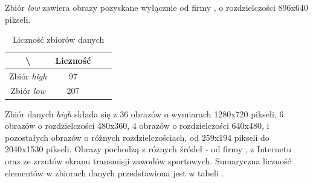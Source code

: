 Zbiór \textit{low} zawiera obrazy pozyskane wyłącznie od firmy \blue{}, o rozdzielczości 896x640 pikseli.

\begin{table}[!h]
	\centering
	\caption{Liczność zbiorów danych}
	\vspace{6pt}
	{\footnotesize
		\begin{tabular}{|c|c|c|c|}
			\hline \textbackslash & Liczność \\
      \hline Zbiór \textit{high} & 97 \\
      \hline Zbiór \textit{low} & 207 \\
      \hline
    \end{tabular}
    \label{Tab:licznosc}
	}
	\vspace{0pt}
\end{table}

Zbiór danych \textit{high} składa się z 36 obrazów o wymiarach 1280x720 pikseli, 6 obrazów o rozdzielczości 480x360, 4 obrazów o rozdzielczości 640x480, i pozostałych obrazów o różnych rozdzielczościach, od 259x194 pikseli do 2040x1530 pikseli. Obrazy pochodzą z różnych źródeł - od firmy \blue{}, z Internetu oraz ze zrzutów ekranu transmisji zawodów sportowych. Sumaryczna liczność elementów w zbiorach danych przedstawiona jest w tabeli .
